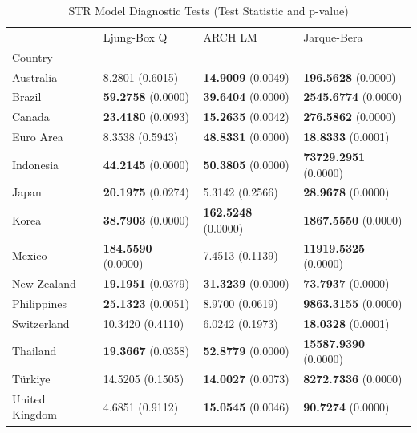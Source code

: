\begin{table}
\caption{STR Model Diagnostic Tests (Test Statistic and p-value)}
\label{tab:str_diagnostics}
\begin{tabular}{llll}
\toprule
 & Ljung-Box Q & ARCH LM & Jarque-Bera \\
Country &  &  &  \\
\midrule
Australia & 8.2801 (0.6015) & \textbf{14.9009} (0.0049) & \textbf{196.5628} (0.0000) \\
Brazil & \textbf{59.2758} (0.0000) & \textbf{39.6404} (0.0000) & \textbf{2545.6774} (0.0000) \\
Canada & \textbf{23.4180} (0.0093) & \textbf{15.2635} (0.0042) & \textbf{276.5862} (0.0000) \\
Euro Area & 8.3538 (0.5943) & \textbf{48.8331} (0.0000) & \textbf{18.8333} (0.0001) \\
Indonesia & \textbf{44.2145} (0.0000) & \textbf{50.3805} (0.0000) & \textbf{73729.2951} (0.0000) \\
Japan & \textbf{20.1975} (0.0274) & 5.3142 (0.2566) & \textbf{28.9678} (0.0000) \\
Korea & \textbf{38.7903} (0.0000) & \textbf{162.5248} (0.0000) & \textbf{1867.5550} (0.0000) \\
Mexico & \textbf{184.5590} (0.0000) & 7.4513 (0.1139) & \textbf{11919.5325} (0.0000) \\
New Zealand & \textbf{19.1951} (0.0379) & \textbf{31.3239} (0.0000) & \textbf{73.7937} (0.0000) \\
Philippines & \textbf{25.1323} (0.0051) & 8.9700 (0.0619) & \textbf{9863.3155} (0.0000) \\
Switzerland & 10.3420 (0.4110) & 6.0242 (0.1973) & \textbf{18.0328} (0.0001) \\
Thailand & \textbf{19.3667} (0.0358) & \textbf{52.8779} (0.0000) & \textbf{15587.9390} (0.0000) \\
Türkiye & 14.5205 (0.1505) & \textbf{14.0027} (0.0073) & \textbf{8272.7336} (0.0000) \\
United Kingdom & 4.6851 (0.9112) & \textbf{15.0545} (0.0046) & \textbf{90.7274} (0.0000) \\
\bottomrule
\end{tabular}
\end{table}
